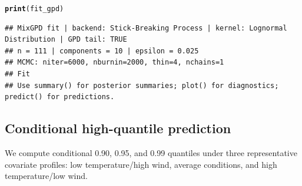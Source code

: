 \documentclass[article]{jss}\usepackage[]{graphicx}\usepackage[]{xcolor}
\makeatletter
\newcommand{\hldef}[1]{\textcolor[rgb]{0.345,0.345,0.345}{#1}}%
\newcommand{\hlkwd}[1]{\textcolor[rgb]{0.737,0.353,0.396}{\textbf{#1}}}%
\newenvironment{kframe}{%
 \def\at@end@of@kframe{}%
 \ifinner\ifhmode%
  \def\at@end@of@kframe{\end{minipage}}%
  \begin{minipage}{\columnwidth}%
 \fi\fi%
 \def\FrameCommand##1{\hskip\@totalleftmargin \hskip-\fboxsep
 \colorbox{shadecolor}{##1}\hskip-\fboxsep
     \hskip-\linewidth \hskip-\@totalleftmargin \hskip\columnwidth}%
 \MakeFramed {\advance\hsize-\width
   \@totalleftmargin\z@ \linewidth\hsize
   \@setminipage}}%
 {\par\unskip\endMakeFramed%
 \at@end@of@kframe}
\newenvironment{knitrout}{}{} %
\makeatother
\begin{document}
\begin{knitrout}
\begin{kframe}
\begin{verbatim}
\end{verbatim}
\begin{alltt}
\hlkwd{print}\hldef{(fit_gpd)}
\end{alltt}
\begin{verbatim}
## MixGPD fit | backend: Stick-Breaking Process | kernel: Lognormal Distribution | GPD tail: TRUE
## n = 111 | components = 10 | epsilon = 0.025
## MCMC: niter=6000, nburnin=2000, thin=4, nchains=1 
## Fit
## Use summary() for posterior summaries; plot() for diagnostics; predict() for predictions.
\end{verbatim}
\end{kframe}
\end{knitrout}

\subsection{Conditional high-quantile prediction}

We compute conditional 0.90, 0.95, and 0.99 quantiles under
three representative covariate profiles:
low temperature/high wind, average conditions, and high temperature/low wind.
\end{document}
